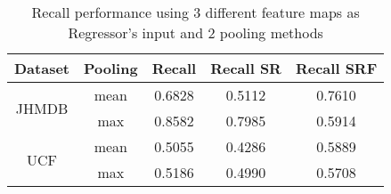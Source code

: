 \documentclass{report}
\begin{document}
\begin{table}[h]
  \centering
  \begin{tabular}{||c | c || c  c  c ||}
    \hline
    \textbf{Dataset} & \textbf{Pooling}  & \textbf{Recall} &  \textbf{ Recall SR}  &  \textbf{Recall SRF} \\
    \hline
    \multirow{2}{*}{JHMDB} & mean &  0.6828  & 0.5112  & 0.7610 \\
    \cline{2-5}
    {} & max &  0.8582 & 0.7985 & 0.5914\\
    \hline
    \multirow{2}{*}{UCF} & mean & 0.5055 & 0.4286 & 0.5889 \\
    \cline{2-5}
    {} & max & 0.5186 & 0.4990 & 0.5708 \\
    \hline

  \end{tabular}
  \caption{Recall performance using 3 different feature maps as Regressor's input and 2 pooling methods}
  \label{table:reg_1_2}
\end{table}
\end{document}
